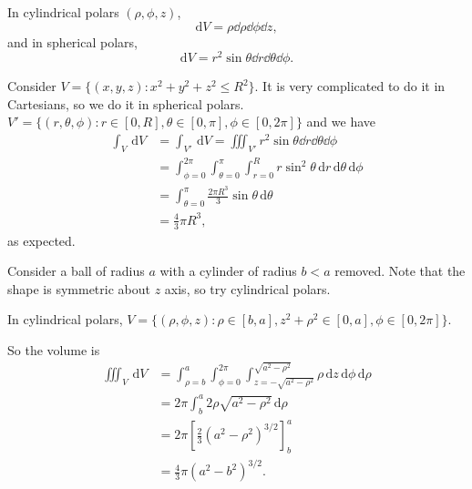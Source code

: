 \begin{example}
    In cylindrical polars $ (\rho,\phi,z) $, 
    \[
        \mathrm{d} V= \rho\dd\rho \dd \phi\dd z,
    \]
    and in spherical polars, 
    \[
        \mathrm{d} V = r^2 \sin \theta\dd r\dd \theta \dd \phi.
    \]
\end{example}
\begin{example}
    Consider $ V=\{(x,y,z):x^2+y^2+z^2\le R^2\} $. It is very complicated to do it in Cartesians, so we do it in spherical polars. $V'= \{(r,\theta,\phi): r\in[0,R], \theta\in [0,\pi],\phi\in [0,2\pi]\} $ and we have 
    \begin{align*}
        \int_{V} \,\mathrm{d}V &= \int_{V'} \,\mathrm{d}V = \iiint_{V'}r^2 \sin \theta\dd r\dd \theta\dd \phi\\ 
        &= \int_{\phi=0}^{2\pi}\int_{\theta=0}^{\pi}\int_{r=0}^{R} r \sin^2\theta \,\mathrm{d}r \,\mathrm{d}\theta \,\mathrm{d}\phi \\ 
        &= \int_{\theta=0}^{\pi} \frac{2\pi R^3}{3}\sin \theta \,\mathrm{d}\theta\\ 
        &=\frac{4}{3}\pi R^3,
    \end{align*}
    as expected.
\end{example}
\begin{example}
    Consider a ball of radius $a$ with a cylinder of radius $b<a$ removed. Note that the shape is symmetric about $z$ axis, so try cylindrical polars.
    \begin{center}
    \end{center}
    In cylindrical polars, $ V=\{(\rho,\phi,z): \rho\in [b,a],z^2+\rho^2\in[0,a],\phi\in [0,2\pi]\} $.

    So the volume is
    \begin{align*}
        \iiint_V \,\mathrm{d} V &= \int_{\rho=b}^a\int_{\phi=0}^{2\pi}\int_{z=-\sqrt{a^2 - \rho^2}}^{\sqrt{a^2 - \rho^2}}\rho\,\mathrm{d} z\,\mathrm{d} \phi\,\mathrm{d} \rho \\
        &= 2\pi\int_b^a 2\rho\sqrt{a^2 - \rho^2}\,\mathrm{d} \rho\\
        &= 2\pi \left[\frac{2}{3}(a^2 - \rho^2)^{3/2}\right]^a_b\\
        &= \frac{4}{3}\pi (a^2 - b^2)^{3/2}.
    \end{align*}
\end{example}

